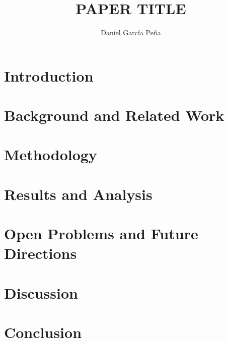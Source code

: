 \documentclass[acmsmall,review,anonymous]{acmart}
\title{PAPER TITLE}
\author{Daniel Garc\'ia Pe\~na}
\affiliation{%
  \institution{University of Oviedo}
  \city{Oviedo}
  \country{Spain}
}
\affiliation{%
  \institution{Unicaja Bank}
  \country{Spain}
}
\begin{document}
\maketitle

\section{Introduction}


\section{Background and Related Work}


\section{Methodology}


\section{Results and Analysis}


\section{Open Problems and Future Directions}


\section{Discussion}


\section{Conclusion}




\end{document}

